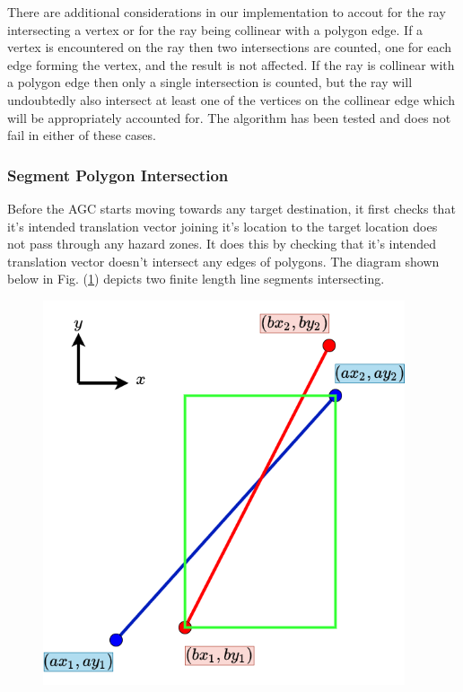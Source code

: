 \documentclass[11pt,landscape]{article}
\begin{document}
\begin{multicols}{3}
There are additional considerations in our implementation to accout for the ray
intersecting a vertex or for the ray being collinear with a polygon edge. If a
vertex is encountered on the ray then two intersections are counted, one for each edge
forming the vertex, and the result is not affected. If the ray is collinear with
a polygon edge then only a single intersection is counted, but the ray will
undoubtedly also intersect at least one of the vertices on the collinear edge
which will be appropriately accounted for. The algorithm has been tested and
does not fail in either of these cases.

\subsubsection{Segment Polygon Intersection}
Before the AGC starts moving towards any target destination, it first checks
that it's intended translation vector joining it's location to the target
location does not pass through any hazard zones. It does this by checking that
it's intended translation vector doesn't intersect any edges of polygons. The
diagram shown below in Fig. (\ref{fig:segment_intersection}) depicts two finite
length line segments intersecting.
\begin{figure}[H]
    \begin{mdframed}
        \begin{center}
            \includegraphics[width=0.95\textwidth]{segment_intersection.png}
        \end{center}
    \end{mdframed}
    \label{fig:segment_intersection}
\end{figure}
 

\end{multicols}
\end{document}
